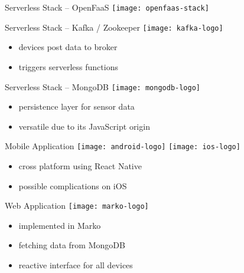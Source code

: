 \documentclass[aspectratio=1610]{beamer}
\begin{document}
  \begin{frame}{Serverless Stack -- OpenFaaS}
    \texttt{[image: openfaas-stack]}
  \end{frame}

  \begin{frame}{Serverless Stack -- Kafka / Zookeeper}
    \texttt{[image: kafka-logo]}

    \vspace*{1.5em}

    \begin{itemize}
      \item devices post data to broker
      \item triggers serverless functions
    \end{itemize}
  \end{frame}

  \begin{frame}{Serverless Stack -- MongoDB}
    \texttt{[image: mongodb-logo]}

    \vspace*{1.5em}

    \begin{itemize}
      \item persistence layer for sensor data
      \item versatile due to its JavaScript origin
    \end{itemize}
  \end{frame}

  \begin{frame}{Mobile Application}
    \texttt{[image: android-logo]}
    \hspace*{2em}
    \texttt{[image: ios-logo]}

    \vspace*{2em}

    \begin{itemize}
      \item cross platform using React Native
      \item possible complications on iOS
    \end{itemize}
  \end{frame}

  \begin{frame}{Web Application}
    \texttt{[image: marko-logo]}

    \vspace*{2em}

    \begin{itemize}
      \item implemented in Marko
      \item fetching data from MongoDB
      \item reactive interface for all devices
    \end{itemize}
  \end{frame}
\end{document}
